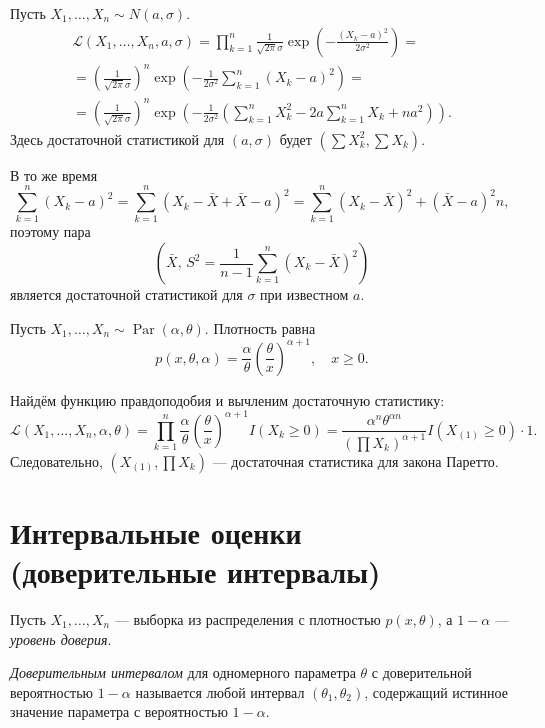 \begin{ex}
  Пусть $X_1, \dots, X_n \sim N(a, \sigma)$.
  \begin{multline*}
		\mathscr{L} (X_1, \dots, X_n, a, \sigma) = \prod_{k=1}^n \frac{1}{\sqrt{2\pi}
		\sigma} \exp\left(-\frac{(X_k-a)^2}{2\sigma^2}\right) =\\= 
		\left(\frac{1}{\sqrt{2\pi}\sigma} \right)^n
		\exp\left(-\frac{1}{2\sigma^2} \sum_{k=1}^n (X_k-a)^2\right) = \\ =
		\left(\frac{1}{\sqrt{2\pi}\sigma}\right)^n \exp\left(-\frac{1}{2\sigma^2}
			\left(\sum_{k=1}^n
		X_k^2 - 2a \sum_{k=1}^n X_k + na^2\right)\right).
  \end{multline*}
  Здесь достаточной статистикой для $ (a, \sigma) $ будет $(\sum X_k^2, \sum
	X_k)$.

  В то же время
	\[
		\sum_{k=1}^n (X_k-a)^2 = \sum_{k=1}^n (X_k - \bar X + \bar X - a)^2 =
		\sum_{k=1}^n (X_k-\bar X)^2 + (\bar X - a)^2 n,
	\]
	поэтому пара
	\[
		\left(\bar X,\, S^2 = \frac{1}{n-1} \sum_{k=1}^n (X_k-\bar X)^2\right)
	\]
	является достаточной статистикой для $\sigma$ при известном $a$.
\end{ex}

\begin{ex}
	Пусть $X_1, \dots, X_n \sim \operatorname{Par}(\alpha, \theta)$. Плотность
	равна
	\[
		p(x, \theta, \alpha) = \frac{\alpha}{\theta}
		\left(\frac{\theta}{x}\right)^{\alpha+1}, \quad x\geqslant 0.
	\]

	Найдём функцию правдоподобия и вычленим достаточную статистику:
  \[
		\mathscr{L} (X_1, \dots, X_n, \alpha, \theta) = \prod_{k=1}^n \frac{\alpha}{\theta}
		\left(\frac{\theta}{x}\right)^{\alpha+1} I(X_k \geqslant 0) = \frac{\alpha^n
		\theta^{\alpha n}}{(\prod X_k)^{\alpha+1}} I(X_{(1)}\geqslant 0) \cdot 1.
  \]
Следовательно, 
  $(X_{(1)}, \prod X_k)$ --- достаточная статистика для закона Паретто.
\end{ex}

\section{Интервальные оценки (доверительные интервалы)}
Пусть $X_1, \dots, X_n$ --- выборка из распределения с плотностью $p(x,
\theta)$, а $1-\alpha$ --- \emph{уровень доверия}.

\begin{definition}
	\emph{Доверительным интервалом} для одномерного параметра $\theta$ с 
доверительной вероятностью $1  - \alpha$ называется любой интервал $(\theta_1, \theta_2)$, 
содержащий истинное значение параметра с вероятностью $1 - \alpha$.  
\end{definition}


